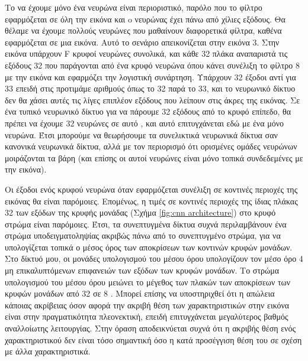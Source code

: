 Το να έχουμε μόνο ένα νευρώνα είναι περιοριστικό, παρόλο που το φίλτρο εφαρμόζεται σε όλη την εικόνα και o νευρώνας έχει πάνω από χίλιες εξόδους. Θα θέλαμε να έχουμε πολλούς νευρώνες που μαθαίνουν διαφορετικά φίλτρα, καθένα εφαρμόζεται σε μια εικόνα. Αυτό το σενάριο απεικονίζεται στην εικόνα 3. Στην εικόνα υπάρχουν F κρυφοί νευρώνες συνολικά, και κάθε 32 πλάκα αναπαριστά τις εξόδους 32 που παράγονται από ένα κρυφό νευρώνα όπου κάνει συνέλιξη  το φίλτρο 8 με την εικόνα και εφαρμόζει την λογιστική συνάρτηση. Υπάρχουν 32 έξοδοι αντί για 33 επειδή στις  προτιμάμε αριθμούς όπως το 32 παρά το 33, και το νευρωνικό δίκτυο δεν θα χάσει αυτές τις λίγες επιπλέον εξόδους που λείπουν στις άκρες της εικόνας. Σε ένα τυπικό νευρωνικό δίκτυο για να πάρουμε 32 εξόδους από το κρυφό επίπεδο, θα πρέπει να έχουμε 32 νευρώνες σε αυτό ,  και αυτό επιτυγχάνεται εδώ με ένα μόνο νευρώνα. Έτσι μπορούμε να θεωρήσουμε τα συνελικτικά νευρωνικά δίκτυα σαν κανονικά νευρωνικά δίκτυα, αλλά με τον περιορισμό ότι ορισμένες ομάδες νευρώνων μοιράζονται τα βάρη (και επίσης οι αυτοί νευρώνες είναι μόνο τοπικά συνδεδεμένες με την εικόνα).

Οι έξοδοι ενός κρυφού νευρώνα όταν εφαρμόζεται συνέλιξη σε κοντινές περιοχές της εικόνας θα είναι παρόμοιες. Επομένως, η τιμές σε κοντινές περιοχές της ίδιας πλάκας 32 των εξόδων της κρυφής μονάδας (Σχήμα \ref{fig:cnn architecture}) στο κρυφό στρώμα είναι παρόμοιες. Έτσι, τα συνεπτυγμένα δίκτυα συχνά περιλαμβάνουν ένα στρώμα υποδειγματοληψίας ακριβώς πάνω από το συνεπτυγμένο στρώμα, για να υπολογίζεται τοπικά ο μέσος όρος των αποκρίσεων των κοντινών κρυφών μονάδων. Στο δίκτυό μου, οι μονάδες υπολογισμού του μέσου όρου υπολογίζουν τον μέσο όρο 4  μη επικαλυπτόμενων επιφανειών των εξόδων των κρυφών μονάδων. Το στρώμα υπολογισμού του μέσου όρου μειώνει το μέγεθος των πλακών των αποκρίσεων των κρυφών μονάδων από 32 σε 8 . Μπορεί επίσης να υποστηριχθεί ότι η απώλεια κάποιας ακρίβειας όσον αφορά την ακριβή θέση των χαρακτηριστικών στην εικόνα είναι στην πραγματικότητα πλεονεκτική, επειδή επιτυγχάνεται μεγαλύτερος βαθμός αναλλοίωτης λειτουργίας. Στην όραση αποδεικνύεται συχνά ότι η ακριβής θέση ενός χαρακτηριστικού δεν είναι τόσο σημαντική όσο η κατά προσέγγιση θέση του σε σχέση με άλλα χαρακτηριστικά.


